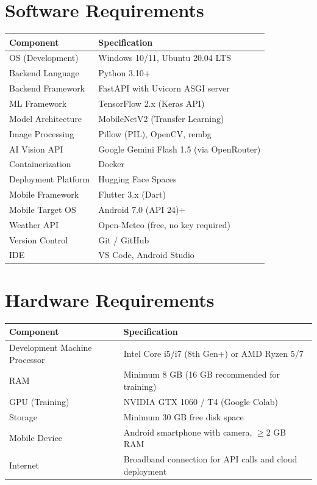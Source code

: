 \documentclass[12pt,a4paper]{report}
\begin{document}
\section{Software Requirements}
\begin{center}
\begin{tabular}{|p{4cm}|p{7.5cm}|}
\hline
\textbf{Component} & \textbf{Specification} \\
\hline
OS (Development) & Windows 10/11, Ubuntu 20.04 LTS \\
\hline
Backend Language & Python 3.10+ \\
\hline
Backend Framework & FastAPI with Uvicorn ASGI server \\
\hline
ML Framework & TensorFlow 2.x (Keras API) \\
\hline
Model Architecture & MobileNetV2 (Transfer Learning) \\
\hline
Image Processing & Pillow (PIL), OpenCV, rembg \\
\hline
AI Vision API & Google Gemini Flash 1.5 (via OpenRouter) \\
\hline
Containerization & Docker \\
\hline
Deployment Platform & Hugging Face Spaces \\
\hline
Mobile Framework & Flutter 3.x (Dart) \\
\hline
Mobile Target OS & Android 7.0 (API 24)+ \\
\hline
Weather API & Open-Meteo (free, no key required) \\
\hline
Version Control & Git / GitHub \\
\hline
IDE & VS Code, Android Studio \\
\hline
\end{tabular}
\end{center}

\section{Hardware Requirements}
\begin{center}
\begin{tabular}{|p{4cm}|p{7.5cm}|}
\hline
\textbf{Component} & \textbf{Specification} \\
\hline
Development Machine Processor & Intel Core i5/i7 (8th Gen+) or AMD Ryzen 5/7 \\
\hline
RAM & Minimum 8 GB (16 GB recommended for training) \\
\hline
GPU (Training) & NVIDIA GTX 1060 / T4 (Google Colab) \\
\hline
Storage & Minimum 30 GB free disk space \\
\hline
Mobile Device & Android smartphone with camera, $\geq$2 GB RAM \\
\hline
Internet & Broadband connection for API calls and cloud deployment \\
\hline
\end{tabular}
\end{center}
\end{document}
